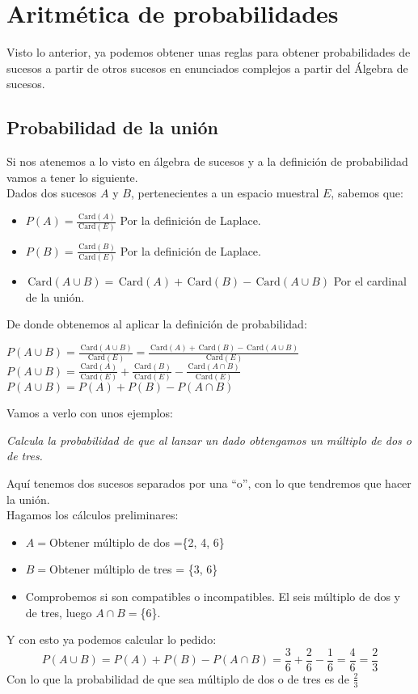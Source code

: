 \documentclass[a4paper,10pt,answers]{exam}
\newcommand{\Card}{\,\mathrm{Card}}
\begin{document}
\section{Aritmética de probabilidades}
Visto lo anterior, ya podemos obtener unas reglas para obtener probabilidades de sucesos a partir de otros sucesos en enunciados complejos a partir del Álgebra de sucesos.

\subsection{Probabilidad de la unión}
Si nos atenemos a lo visto en álgebra de sucesos y a la definición de probabilidad vamos a tener lo siguiente.\\
Dados dos sucesos $A$ y $B$, pertenecientes a un espacio muestral $E$, sabemos que:
\begin{itemize}
	\item $P(A) = \frac{\Card(A)}{\Card(E)}$ Por la definición de Laplace.
	\item $P(B) = \frac{\Card(B)}{\Card(E)}$ Por la definición de Laplace.
	\item $\Card (A \cup B) = \Card(A) + \Card(B) - \Card (A \cup B)$ Por el cardinal de la unión.
\end{itemize}
De donde obtenemos al aplicar la definición de probabilidad:
\begin{center}
$P(A \cup B) = \frac{\Card(A \cup B)}{\Card(E)} = \frac{\Card(A) + \Card(B) - \Card (A \cup B)}{\Card(E)}$\vspace{2mm}\\
$P(A \cup B) = \frac{\Card(A)}{\Card(E)} + \frac{\Card(B)}{\Card(E)} - \frac{\Card(A \cap B)}{\Card(E)}$\vspace{2mm}\\
$P(A \cup B) = P(A) + P(B) - P(A \cap B)$
\end{center}

Vamos a verlo con unos ejemplos:
\begin{questions}
\question\emph{Calcula la probabilidad de que al lanzar un dado obtengamos un múltiplo de dos o de tres.}
\begin{solution}
Aquí tenemos dos sucesos separados por una ``o'', con lo que tendremos que hacer la unión.\\
Hagamos los cálculos preliminares:
\begin{itemize}
	\item $A=$Obtener múltiplo de dos =\{2, 4, 6\}
	\item $B=$Obtener múltiplo de tres = \{3, 6\}
	\item Comprobemos si son compatibles o incompatibles. El seis múltiplo de dos y de tres, luego $A \cap B=$\{6\}.
\end{itemize}

Y con esto ya podemos calcular lo pedido:
\[
P(A \cup B) = P(A) + P(B) - P(A \cap B) = \frac{3}{6} + \frac{2}{6} - \frac{1}{6} = \frac{4}{6} = \frac{2}{3}
\]
Con lo que la probabilidad de que sea múltiplo de dos o de tres es de $\frac{2}{3}$
\end{solution}
\end{questions}
\end{document}
